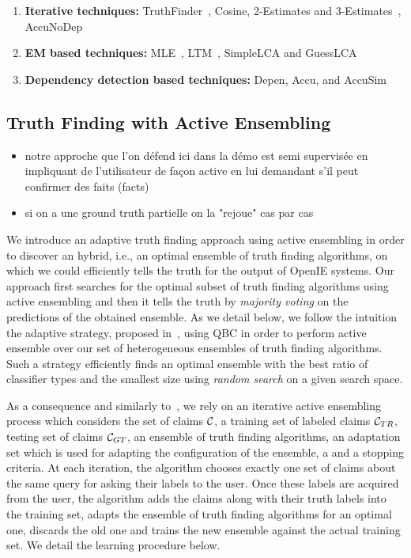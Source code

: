 \begin{enumerate}
 \item \textbf{Iterative techniques:} TruthFinder~\cite{YinHY08}, Cosine, 2-Estimates and 3-Estimates~\cite{GallandAMS10}, 
 AccuNoDep~\cite{DongBS09}
 \item \textbf{EM based techniques:} MLE~\cite{WangKLA12}, LTM~\cite{ZhaoRGH12}, SimpleLCA and GuessLCA~\cite{PasternackR13}
 \item \textbf{Dependency detection based techniques:} Depen, Accu, and AccuSim~\cite{DongBS09}
\end{enumerate}



\subsection{Truth Finding with Active Ensembling}
\begin{itemize}
 \item notre approche que l'on défend ici dans la démo est  semi supervisée en impliquant de l'utilisateur de façon active
en lui demandant s'il peut confirmer des faits (facts)
\item si on a une ground truth partielle on la "rejoue" cas par cas
\end{itemize}

\medskip

We introduce an adaptive truth finding approach using active ensembling in order to discover an hybrid, i.e., an optimal
ensemble of truth finding algorithms, on which we could efficiently tells the truth for the output of OpenIE systems.
Our approach first searches for the optimal subset of truth finding algorithms using active ensembling and then it 
tells the truth by \emph{majority voting} on the predictions of the obtained ensemble. As we detail below, we follow the intuition
the adaptive strategy, proposed in~\cite{Lu15}, using QBC in order to perform active ensemble over our set of heterogeneous 
ensembles of truth finding algorithms. Such a strategy efficiently finds an optimal ensemble with the best ratio of classifier
types and the smallest size using \emph{random search} on a given search space.


As a consequence and similarly to~\cite{Lu15}, we rely on an iterative active ensembling process which considers the set of claims $\mathcal{C}{}$, 
a training set of labeled claims $\mathcal{C}_{TR}$, testing set of claims $\mathcal{C}_{GT}$, an ensemble of truth finding algorithms, an adaptation
set which is used for adapting the configuration of the ensemble, a  and a stopping criteria. At each iteration, the algorithm chooses exactly one
set of claims about the same query for asking their labels to the user. Once these labels are acquired from the user, the algorithm  adds the claims 
along with their truth labels into the training set, adapts the ensemble of truth finding algorithms for an optimal one, discards the old one and trains
the new ensemble against the actual training set. We detail the learning procedure below.

